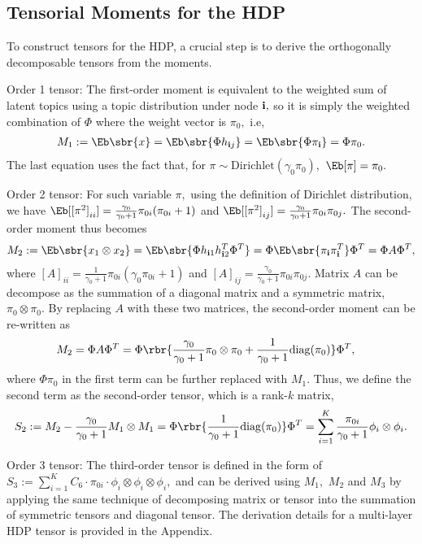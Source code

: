 \documentclass[twoside,11pt]{article}
\newcommand{\ib}{{\bf i}}
\begin{document}
{\subsection{Tensorial Moments for the HDP}
\label{sec:spec}
To construct tensors for the HDP,  a crucial step is to derive the orthogonally
decomposable tensors from the moments. 
\begin{description*}
\item[Order 1 tensor:] The first-order moment is equivalent to the weighted sum of latent topics using a topic distribution under node $\ib,$ so it is simply the weighted combination of $\Phi$ where the weight vector is $\pi_0,$ i.e,
\begin{align}
M_1 := \Eb \sbr{x} = \Eb \sbr{\Phi h_{\ib j}} = \Eb \sbr{\Phi \pi_{\ib}} = \Phi \pi_{0}.
\end{align}
The last equation uses the fact that, for $\pi \sim \mathrm{Dirichlet}( \gamma_0 \pi_0), $ $\Eb[\pi] = \pi_0.$
 \item[Order 2 tensor:] For such variable $\pi,$ using the definition of Dirichlet distribution, we have $\Eb[[\pi^2]_{ii}] = \frac{\gamma_0}{\gamma_0 + 1} \pi_{0i} (\pi_{0i}+1)$ and $\Eb[[\pi^2]_{ij}] = \frac{\gamma_0}{\gamma_0 + 1} \pi_{0i} \pi_{0j}.$ The second-order moment thus becomes
\begin{align}
M_2 :=\Eb \sbr{x_1 \otimes x_2} = \Eb \sbr{\Phi h_{\ib 1} h_{\ib 2}^T \Phi^T } = \Phi \Eb \sbr{ \pi_{\ib} \pi_{\ib}^T }\Phi^T = \Phi A \Phi^T, 
\end{align}
where $[A]_{ii} = \frac{1}{\gamma_0 + 1} \pi_{0i} (\gamma_0\pi_{0i}+1) $ and $[A]_{ij} = \frac{\gamma_0}{\gamma_0 + 1} \pi_{0i} \pi_{0j}.$ Matrix $A$ can be decompose as the summation of a diagonal matrix and a symmetric matrix, $\pi_0 \otimes \pi_0.$ By replacing $A$ with these two matrices, the second-order moment can be re-written as 
\begin{align}
 M_2 = \Phi A \Phi^T &= \Phi \rbr{\frac{\gamma_0}{\gamma_0 + 1}\pi_0 \otimes \pi_0 + \frac{1}{\gamma_0 + 1} \mathrm{diag}(\pi_0) }\Phi^T,
\end{align}
where $\Phi \pi_0$ in the first term can be further replaced with $M_1.$ Thus, we define the second term as the second-order tensor, which is a rank-$k$ matrix, 
\begin{align}
S_2 := M_2 - \frac{\gamma_0}{\gamma_0 + 1} M_1 \otimes M_1 = \Phi \rbr{\frac{1}{\gamma_0 + 1} \mathrm{diag}(\pi_0) }\Phi^T  = \sum \limits_{i = 1}^K \frac{\pi_{0i}}{\gamma_0+1} \phi_i \otimes \phi_i.
\end{align}
\item[Order 3 tensor:] The third-order tensor is defined in the form of $S_3 := \sum_{i = 1}^K C_6 \cdot \pi_{0i} \cdot \phi_i \otimes \phi_i \otimes \phi_i,$ and can be derived using $M_1,$ $M_2$ and $M_3$ by applying the same technique of decomposing matrix or tensor into the summation of symmetric tensors and diagonal tensor. The derivation details for a multi-layer HDP tensor is provided in the Appendix. 


\end{description*}}
\end{document}
